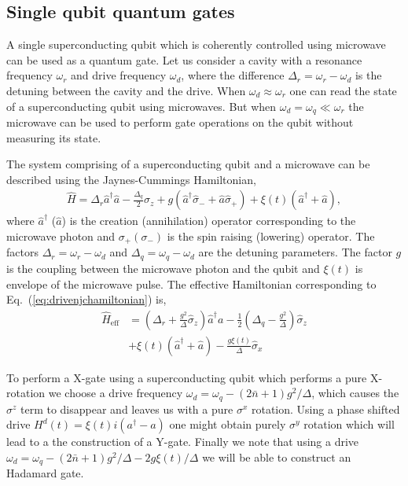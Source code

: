 \documentclass[twocolumn, aps, rmp, amsmath, amssymb, nofootinbib, superscriptaddress, longbibliography, floatfix, table-of-contents, eqsecnum]{revtex4-1}
\begin{document}
\subsection{Single qubit quantum gates}

A single superconducting qubit which is coherently controlled using microwave can be used as a quantum gate. Let us consider a cavity with a resonance frequency $\omega_{r}$ and drive frequency $\omega_{d}$, where the difference $\Delta_{r} = \omega_{r} - \omega_{d}$ is the detuning between the cavity and the drive. When $\omega_{d} \approx \omega_{r}$ one can read the state of a superconducting qubit using microwaves. But when $\omega_{d} = \omega_{q} \ll \omega_{r}$ the microwave can be used to perform gate operations on the qubit without measuring its state.

The system comprising of a superconducting qubit and a microwave can be described using the Jaynes-Cummings Hamiltonian,
\begin{align}
\hat{H} = \Delta _{r} \hat{a}^{\dag} \hat{a} - \frac{\Delta_{q}}{2} \hat\sigma_{z} + g (\hat{a}^{\dag} \hat\sigma_{-} + \hat{a} \hat\sigma_{+}) + \xi(t) (\hat{a}^{\dag} + \hat{a}),
\label{eq:driven_jc_hamiltonian}
\end{align}
where $\hat{a}^{\dag}$ ($\hat{a}$) is the creation (annihilation) operator corresponding to the microwave photon and $\sigma_{+} (\sigma_{-})$ is the spin raising (lowering) operator. The factors $\Delta_{r} = \omega_{r} - \omega_{d}$ and $\Delta_{q} = \omega_{q} - \omega_{d}$ are the detuning parameters. The factor $g$ is the coupling between the microwave photon and the qubit and $\xi(t)$ is envelope of the microwave pulse. The effective Hamiltonian corresponding to Eq.~(\ref{eq:drivenjchamiltonian}) is,
\begin{align}
\hat{H}_\mathrm{eff} &= \left( \Delta_{r} + \frac{g^{2}}{\Delta} \hat\sigma_{z} \right) \hat{a}^{\dag} a - \frac{1}{2} \left(\Delta_{q} - \frac{g^{2}}{\Delta} \right) \hat\sigma_{z} \nonumber\\
&+ \xi(t) (\hat{a}^{\dag} + \hat{a}) - \frac{g \xi(t)}{\Delta} \hat\sigma_{x}
\end{align}

To perform a X-gate using a superconducting qubit which performs a pure X-rotation we choose a drive frequency $\omega_{d} = \omega_{q} - (2 \bar{n} + 1) g^{2}/\Delta$, which causes the $\sigma^{z}$ term to disappear and leaves us with a pure $\sigma^{x}$ rotation. Using a phase shifted drive $H^{d}(t) = \xi(t) i (a^{\dag} - a)$ one might obtain purely $\sigma^{y}$ rotation which will lead to a the construction of a Y-gate. Finally we note that using a drive $\omega_{d} = \omega_{q} - (2 \bar{n} + 1) g^{2}/\Delta - 2 g \xi(t)/\Delta$ we will be able to construct an Hadamard gate. 
\end{document}
